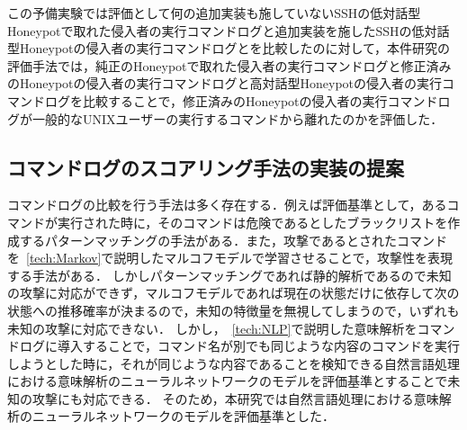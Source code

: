 この予備実験では評価として何の追加実装も施していないSSHの低対話型Honeypotで取れた侵入者の実行コマンドログと追加実装を施したSSHの低対話型Honeypotの侵入者の実行コマンドログとを比較したのに対して，本件研究の評価手法では，純正のHoneypotで取れた侵入者の実行コマンドログと修正済みのHoneypotの侵入者の実行コマンドログと高対話型Honeypotの侵入者の実行コマンドログを比較することで，修正済みのHoneypotの侵入者の実行コマンドログが一般的なUNIXユーザーの実行するコマンドから離れたのかを評価した．%




\subsection{コマンドログのスコアリング手法の実装の提案}
\label{eval:implsuge}
コマンドログの比較を行う手法は多く存在する．例えば評価基準として，あるコマンドが実行された時に，そのコマンドは危険であるとしたブラックリストを作成するパターンマッチングの手法がある．また，攻撃であるとされたコマンドを~\ref{tech:Markov}で説明したマルコフモデルで学習させることで，攻撃性を表現する手法がある．
しかしパターンマッチングであれば静的解析であるので未知の攻撃に対応ができず，マルコフモデルであれば現在の状態だけに依存して次の状態への推移確率が決まるので，未知の特徴量を無視してしまうので，いずれも未知の攻撃に対応できない．
しかし，~\ref{tech:NLP}で説明した意味解析をコマンドログに導入することで，コマンド名が別でも同じような内容のコマンドを実行しようとした時に，それが同じような内容であることを検知できる自然言語処理における意味解析のニューラルネットワークのモデルを評価基準とすることで未知の攻撃にも対応できる．
そのため，本研究では自然言語処理における意味解析のニューラルネットワークのモデルを評価基準とした．

